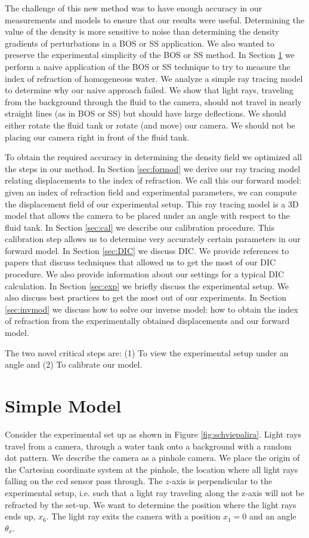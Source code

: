 \documentclass{article}
\begin{document}
The challenge of this new method was to have enough accuracy in our measurements and models to ensure that our results were useful. Determining the value of the density is more sensitive to noise than determining the density gradients of perturbations in a BOS or SS application. We also wanted to preserve the experimental simplicity of the BOS or SS method. In Section \ref{sec:simmod} we perform a naive application of the BOS or SS technique to try to measure the index of refraction of homogeneous water. We analyze a simple ray tracing model to determine why our naive approach failed. We show that light rays, traveling from the background through the fluid to the camera, should not travel in nearly straight lines (as in BOS or SS) but should have large deflections. We should either rotate the fluid tank or rotate (and move) our camera. We should not be placing our camera right in front of the fluid tank. 

To obtain the required accuracy in determining the density field we optimized all the steps in our method. In Section \ref{sec:formod} we derive our ray tracing model relating displacements to the index of refraction. We call this our forward model: given an index of refraction field and experimental parameters, we can compute the displacement field of our experimental setup. This ray tracing model is a 3D model that allows the camera to be placed under an angle with respect to the fluid tank. In Section \ref{sec:cal} we describe our calibration procedure. This calibration step allows us to determine very accurately certain parameters in our forward model.  In Section \ref{sec:DIC} we discuss DIC. We provide references to papers that discuss techniques that allowed us to get the most of our DIC procedure. We also provide information about our settings for a typical DIC calculation. In Section \ref{sec:exp} we briefly discuss the experimental setup. We also discuss best practices to get the most out of our experiments. In Section \ref{sec:invmod} we discuss how to solve our inverse model: how to obtain the index of refraction from the experimentally obtained displacements and our forward model. 

The two novel critical steps are: (1) To view the experimental setup under an angle and (2) To calibrate our model. 

\section{Simple Model}
\label{sec:simmod}
Consider the experimental set up as shown in Figure \ref{fig:schviepalira}. Light rays travel from a camera, through a water tank onto a background with a random dot pattern.  We describe the camera as a pinhole camera. We place the origin of the Cartesian coordinate system at the pinhole, the location where all light rays falling on the ccd sensor pass through. The $z$-axis is perpendicular to the experimental setup, i.e. such that a light ray traveling along the z-axis will not be refracted by the set-up. We want to determine the position where the light rays ends up, $x_6$. The light ray exits the camera with a position $x_1 = 0$ and an angle $\theta_x$. %
\end{document}
